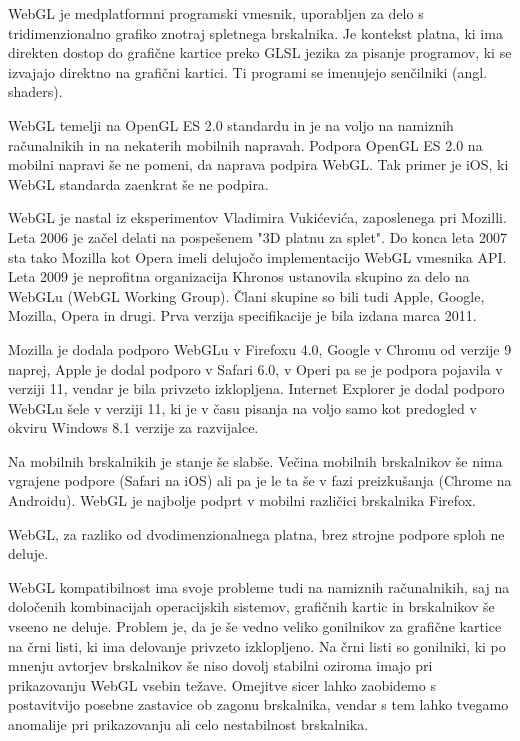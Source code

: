 WebGL \cite{webgl} je medplatformni programski vmesnik, uporabljen za delo s tridimenzionalno grafiko znotraj spletnega brskalnika. Je kontekst platna, ki ima direkten dostop do grafične kartice preko GLSL jezika za pisanje programov, ki se izvajajo direktno na grafični kartici. Ti programi se imenujejo senčilniki (angl. shaders). 

WebGL temelji na OpenGL ES 2.0 standardu in je na voljo na namiznih računalnikih in na nekaterih mobilnih napravah. Podpora OpenGL ES 2.0 na mobilni napravi še ne pomeni, da naprava podpira WebGL. Tak primer je iOS, ki WebGL standarda zaenkrat še ne podpira.

WebGL je nastal iz eksperimentov Vladimira Vukićevića, zaposlenega pri Mozilli. Leta 2006 je začel delati na pospešenem "3D platnu za splet". Do konca leta 2007 sta tako Mozilla kot Opera imeli delujočo implementacijo WebGL vmesnika API. Leta 2009 je neprofitna organizacija Khronos ustanovila skupino za delo na WebGLu (WebGL Working Group). Člani skupine so bili tudi Apple, Google, Mozilla, Opera in drugi. Prva verzija specifikacije je bila izdana marca 2011.

Mozilla je dodala podporo WebGLu v Firefoxu 4.0, Google v Chromu od verzije 9 naprej, Apple je dodal podporo v Safari 6.0, v Operi pa se je podpora pojavila v verziji 11, vendar je bila privzeto izklopljena. Internet Explorer je dodal podporo WebGLu šele v verziji 11, ki je v času pisanja na voljo samo kot predogled v okviru Windows 8.1 verzije za razvijalce.

Na mobilnih brskalnikih je stanje še slabše. Večina mobilnih brskalnikov še nima vgrajene podpore (Safari na iOS) ali pa je le ta še v fazi preizkušanja (Chrome na Androidu). WebGL je najbolje podprt v mobilni različici brskalnika Firefox.

WebGL, za razliko od dvodimenzionalnega platna, brez strojne podpore sploh ne deluje. 

WebGL kompatibilnost ima svoje probleme tudi na namiznih računalnikih, saj na določenih kombinacijah operacijskih sistemov, grafičnih kartic in brskalnikov še vseeno ne deluje. Problem je, da je še vedno veliko gonilnikov za grafične kartice na črni listi, ki ima delovanje privzeto izklopljeno. Na črni listi so gonilniki, ki po mnenju avtorjev brskalnikov še niso dovolj stabilni oziroma imajo pri prikazovanju WebGL vsebin težave. Omejitve sicer lahko zaobidemo s postavitvijo posebne zastavice ob zagonu brskalnika, vendar s tem lahko tvegamo anomalije pri prikazovanju ali celo nestabilnost brskalnika.

